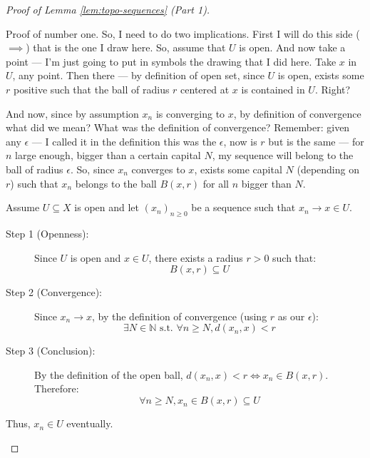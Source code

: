 \begin{proof}[Proof of Lemma \ref{lem:topo-sequences} (Part 1)]
\begin{spoken-clean}[00:15:30 - 00:17:15]
Proof of number one. So, I need to do two implications. First I will do this side ($\implies$) that is the one I draw here. So, assume that $U$ is open. And now take a point --- I'm just going to put in symbols the drawing that I did here. Take $x$ in $U$, any point. Then there --- by definition of open set, since $U$ is open, exists some $r$ positive such that the ball of radius $r$ centered at $x$ is contained in $U$. Right?

And now, since by assumption $x_n$ is converging to $x$, by definition of convergence what did we mean? What was the definition of convergence? Remember: given any $\epsilon$ --- I called it in the definition this was the $\epsilon$, now is $r$ but is the same --- for $n$ large enough, bigger than a certain capital $N$, my sequence will belong to the ball of radius $\epsilon$. So, since $x_n$ converges to $x$, exists some capital $N$ (depending on $r$) such that $x_n$ belongs to the ball $B(x, r)$ for all $n$ bigger than $N$.
\end{spoken-clean}

\begin{math-stroke}[Forward Implication \texorpdfstring{$\implies$}{=>}]
\begin{ai-proof-skeleton-invisible-content}
\end{ai-proof-skeleton-invisible-content}
Assume $U \subseteq X$ is open and let $(x_n)_{n \ge 0}$ be a sequence such that $x_n \to x \in U$.
\begin{description}
    \item[Step 1 (Openness):] Since $U$ is open and $x \in U$, there exists a radius $r > 0$ such that:
    \[ B(x, r) \subseteq U \]
    \item[Step 2 (Convergence):] Since $x_n \to x$, by the definition of convergence (using $r$ as our $\epsilon$):
    \[ \exists N \in \mathbb{N} \text{ s.t. } \forall n \ge N, d(x_n, x) < r \]
    \item[Step 3 (Conclusion):] By the definition of the open ball, $d(x_n, x) < r \iff x_n \in B(x, r)$. Therefore:
    \[ \forall n \ge N, x_n \in B(x, r) \subseteq U \]
\end{description}
Thus, $x_n \in U$ eventually.
\end{math-stroke}


\end{proof}
